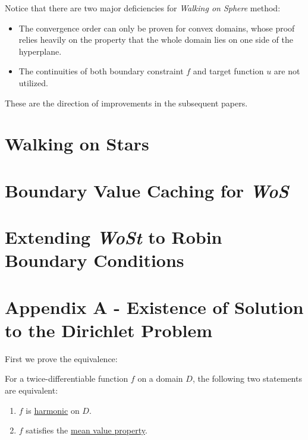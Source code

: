 \documentclass[10pt]{article}
\begin{document}
\begin{remark}
    Notice that there are two major deficiencies for \emph{Walking on Sphere} method:
    \begin{itemize}
        \item The convergence order can only be proven for convex domains, whose proof relies heavily on the property that the whole domain lies on one side of the hyperplane.
        \item The continuities of both boundary constraint $f$ and target function $u$ are not utilized.
    \end{itemize}
    These are the direction of improvements in the subsequent papers.
\end{remark}

\section{Walking on Stars \cite{WalkOnStars}}

\section{Boundary Value Caching for \emph{WoS} \cite{BVCWoS}}

\section{Extending \emph{WoSt} to Robin Boundary Conditions\cite{WalkinRobin}}

\printbibliography

\section{Appendix A - Existence of Solution to the Dirichlet Problem}\label{appendix A}

First we prove the equivalence:

\begin{proposition}
    For a twice-differentiable function $f$ on a domain $D$, the following two statements are equivalent:
    \begin{enumerate}
        \item $f$ is \hyperref[def: harmonic function]{harmonic} on $D$.
        \item $f$ satisfies the \hyperref[def: mean value property]{mean value property}.
    \end{enumerate}
\end{proposition}
\end{document}
